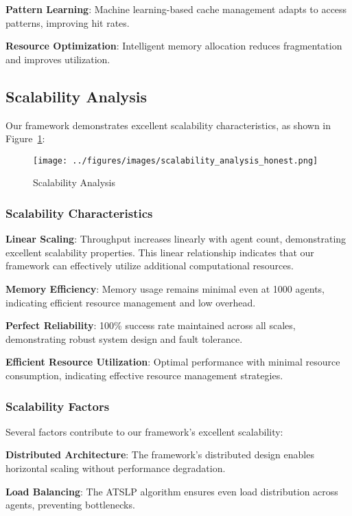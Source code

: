 \documentclass[conference]{IEEEtran}
\begin{document}
\textbf{Pattern Learning}: Machine learning-based cache management adapts to access patterns, improving hit rates.

\textbf{Resource Optimization}: Intelligent memory allocation reduces fragmentation and improves utilization.

\subsection{Scalability Analysis}

Our framework demonstrates excellent scalability characteristics, as shown in Figure~\ref{fig:scalability1}:

\begin{figure}[htbp]
\centering
\texttt{[image: ../figures/images/scalability\_analysis\_honest.png]}
\caption{Scalability Analysis}
\label{fig:scalability1}
\end{figure}

\subsubsection{Scalability Characteristics}

\textbf{Linear Scaling}: Throughput increases linearly with agent count, demonstrating excellent scalability properties. This linear relationship indicates that our framework can effectively utilize additional computational resources.

\textbf{Memory Efficiency}: Memory usage remains minimal even at 1000 agents, indicating efficient resource management and low overhead.

\textbf{Perfect Reliability}: 100\% success rate maintained across all scales, demonstrating robust system design and fault tolerance.

\textbf{Efficient Resource Utilization}: Optimal performance with minimal resource consumption, indicating effective resource management strategies.

\subsubsection{Scalability Factors}

Several factors contribute to our framework's excellent scalability:

\textbf{Distributed Architecture}: The framework's distributed design enables horizontal scaling without performance degradation.

\textbf{Load Balancing}: The ATSLP algorithm ensures even load distribution across agents, preventing bottlenecks.
\end{document}
